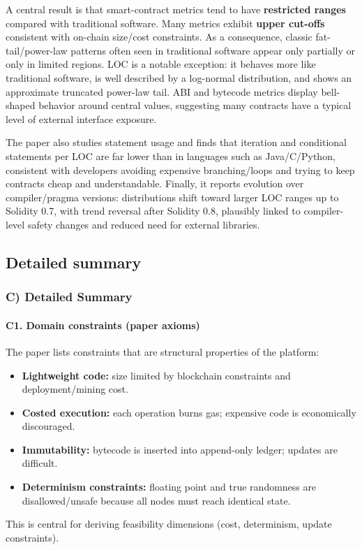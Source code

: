 \documentclass[11pt,a4paper]{article}
\begin{document}
A central result is that smart-contract metrics tend to have \textbf{restricted ranges} compared with traditional software. Many metrics exhibit \textbf{upper cut-offs} consistent with on-chain size/cost constraints. As a consequence, classic fat-tail/power-law patterns often seen in traditional software appear only partially or only in limited regions. LOC is a notable exception: it behaves more like traditional software, is well described by a log-normal distribution, and shows an approximate truncated power-law tail. ABI and bytecode metrics display bell-shaped behavior around central values, suggesting many contracts have a typical level of external interface exposure.

The paper also studies statement usage and finds that iteration and conditional statements per LOC are far lower than in languages such as Java/C/Python, consistent with developers avoiding expensive branching/loops and trying to keep contracts cheap and understandable. Finally, it reports evolution over compiler/pragma versions: distributions shift toward larger LOC ranges up to Solidity 0.7, with trend reversal after Solidity 0.8, plausibly linked to compiler-level safety changes and reduced need for external libraries.

\subsection{Detailed summary}
\subsubsection*{C) Detailed Summary}
\paragraph{C1. Domain constraints (paper axioms)}
The paper lists constraints that are structural properties of the platform:
\begin{itemize}[leftmargin=*]
  \item \textbf{Lightweight code:} size limited by blockchain constraints and deployment/mining cost.
  \item \textbf{Costed execution:} each operation burns gas; expensive code is economically discouraged.
  \item \textbf{Immutability:} bytecode is inserted into append-only ledger; updates are difficult.
  \item \textbf{Determinism constraints:} floating point and true randomness are disallowed/unsafe because all nodes must reach identical state.
\end{itemize}
This is central for deriving feasibility dimensions (cost, determinism, update constraints).
\end{document}
